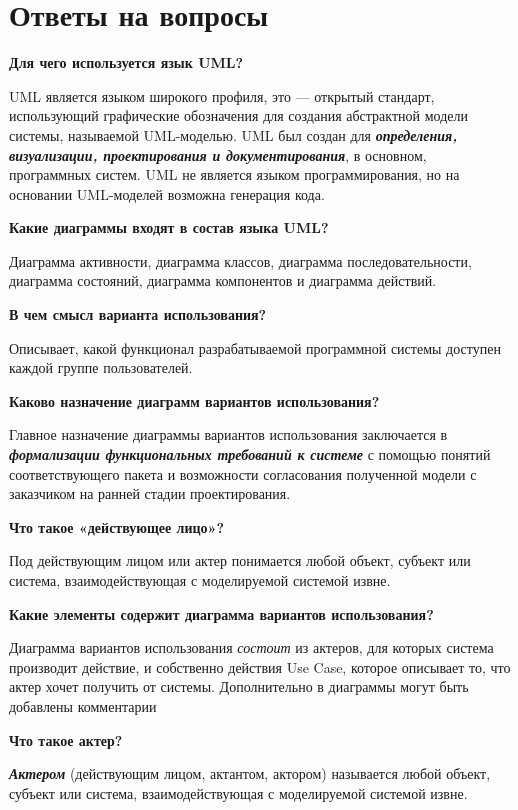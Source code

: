 \newpage

\section*{Ответы на вопросы}

\textbf{Для чего используется язык UML?}\par
UML является языком широкого профиля, это --- открытый стандарт,
использующий графические обозначения для создания абстрактной модели системы,
называемой UML-моделью. UML был создан для
\textbf{\textit{определения, визуализации, проектирования и документирования}},
в основном, программных систем. UML не является языком программирования,
но на основании UML-моделей возможна генерация кода.

\textbf{Какие диаграммы входят в состав языка UML?}\par
Диаграмма активности, диаграмма классов, диаграмма последовательности,
диаграмма состояний, диаграмма компонентов и диаграмма действий.

\textbf{В чем смысл варианта использования?}\par
Описывает, какой функционал разрабатываемой программной системы доступен каждой группе пользователей.

\textbf{Каково назначение диаграмм вариантов использования?}\par
Главное назначение диаграммы вариантов использования заключается
в \textbf{\textit{формализации функциональных требований к системе}} с помощью
понятий соответствующего пакета и возможности согласования полученной
модели с заказчиком на ранней стадии проектирования.

\textbf{Что такое «действующее лицо»?}\par
Под действующим лицом или актер понимается любой объект, субъект или система,
взаимодействующая с моделируемой системой извне.

\textbf{Какие элементы содержит диаграмма вариантов использования?}\par
Диаграмма вариантов использования \textit{состоит} из актеров, для которых
система производит действие, и собственно действия Use Case, которое
описывает то, что актер хочет получить от системы. Дополнительно в
диаграммы могут быть добавлены комментарии

\textbf{Что такое актер?}\par
\textbf{\textit{Актером}} (действующим лицом, актантом, актором)
называется любой объект, субъект или система,
взаимодействующая с моделируемой системой извне.

